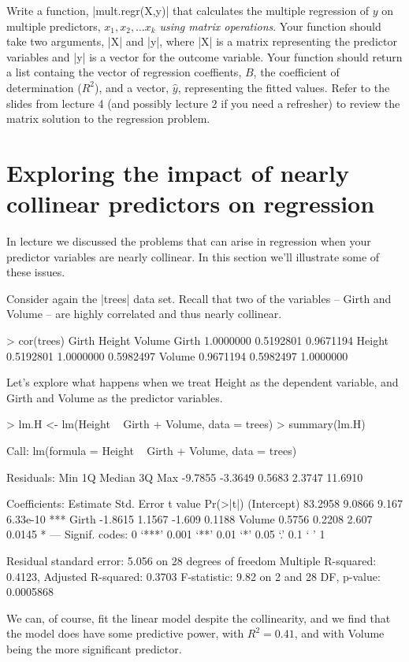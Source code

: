 \medskip
\begin{assignment}
Write a function, |mult.regr(X,y)| that calculates the multiple regression of $y$ on multiple predictors, $x_1, x_2, \ldots x_k$ \emph{using matrix operations}. Your function should take two arguments, |X| and |y|, where |X| is a matrix representing the predictor variables and |y| is a vector for the outcome variable.  Your function should return a list containg the vector of regression coeffients, $B$, the coefficient of determination ($R^2$), and a vector, $\hat{y}$, representing the fitted values.  Refer to the slides from lecture 4 (and possibly lecture 2 if you need a refresher) to review the matrix  solution to the regression problem.
\end{assignment}


\section{Exploring the impact of nearly collinear predictors on regression}

In lecture we discussed the problems that can arise in regression when your predictor variables are nearly collinear. In this section we'll illustrate some of these issues.

Consider again the |trees| data set.  Recall that two of the variables -- Girth and Volume -- are highly correlated and thus nearly collinear.
%
\begin{R}
> cor(trees)
           Girth    Height    Volume
Girth  1.0000000 0.5192801 0.9671194
Height 0.5192801 1.0000000 0.5982497
Volume 0.9671194 0.5982497 1.0000000
\end{R}
%
Let's explore what happens when we treat Height as the dependent variable, and Girth and Volume as the predictor variables.
%
\begin{R}
> lm.H <- lm(Height ~ Girth + Volume, data = trees)
> summary(lm.H)

Call:
lm(formula = Height ~ Girth + Volume, data = trees)

Residuals:
    Min      1Q  Median      3Q     Max 
-9.7855 -3.3649  0.5683  2.3747 11.6910 

Coefficients:
            Estimate Std. Error t value Pr(>|t|)    
(Intercept)  83.2958     9.0866   9.167 6.33e-10 ***
Girth        -1.8615     1.1567  -1.609   0.1188    
Volume        0.5756     0.2208   2.607   0.0145 *  
---
Signif. codes:  0 ‘***’ 0.001 ‘**’ 0.01 ‘*’ 0.05 ‘.’ 0.1 ‘ ’ 1

Residual standard error: 5.056 on 28 degrees of freedom
Multiple R-squared:  0.4123,    Adjusted R-squared:  0.3703 
F-statistic:  9.82 on 2 and 28 DF,  p-value: 0.0005868
\end{R}
%
We can, of course, fit the linear model despite the collinearity, and we find that the model does have some predictive power, with $R^2 = 0.41$, and with Volume being the more significant predictor.

